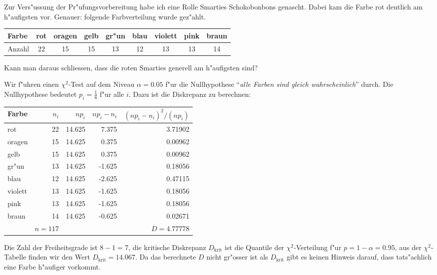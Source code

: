 Zur Vers"ussung der Pr"ufungsvorbereitung habe ich eine Rolle Smarties
Schokobonbons genascht. Dabei kam die Farbe rot deutlich am h"aufigsten vor.
Genauer: folgende Farbverteilung wurde gez"ahlt. 
\begin{center}
\begin{tabular}{|l|cccccccc|}
\hline
Farbe&rot&oragen&gelb&gr"un&blau&violett&pink&braun\\
\hline
Anzahl&22&    15&  15&   13&  12&     13&  13&   14\\
\hline
\end{tabular}
\end{center}
Kann man daraus schliessen, dass die roten Smarties generell am h"aufigsten
sind?

\begin{loesung}
Wir f"uhren einen $\chi^2$-Test auf dem Niveau $\alpha=0.05$
f"ur die Nullhypothese 
``{\it alle Farben sind gleich wahrscheinlich}'' durch.
Die Nullhypothese bedeutet $p_i=\frac18$ f"ur alle $i$.
Dazu ist die Diskrepanz zu berechnen:
\begin{center}
\begin{tabular}{|l|r|r|r|r|}
\hline
Farbe  &$n_i$   &$np_i$&$np_i-n_i$&$(np_i-n_i)^2/(np_i)$\\
\hline
rot    &   22   &14.625&     7.375&              3.71902\\
oragen &   15   &14.625&     0.375&              0.00962\\
gelb   &   15   &14.625&     0.375&              0.00962\\
gr"un  &   13   &14.625&    -1.625&              0.18056\\
blau   &   12   &14.625&    -2.625&              0.47115\\
violett&   13   &14.625&    -1.625&              0.18056\\
pink   &   13   &14.625&    -1.625&              0.18056\\
braun  &   14   &14.625&    -0.625&              0.02671\\
\hline
       &$n=117$ &      &          &$D= 4.77778         $\\
\hline
\end{tabular}
\end{center}
Die Zahl der Freiheitsgrade ist $8-1=7$, die kritische Diskrepanz
$D_{\text{krit}}$ ist die Quantile der $\chi^2$-Verteilung 
f"ur $p=1-\alpha=0.95$, aus der $\chi^2$-Tabelle finden wir den
Wert $D_{\text{krit}}=14.067$. Da das berechnete $D$ nicht gr"osser
ist als $D_{\text{krit}}$ gibt es keinen Hinweis darauf, dass
tats"achlich eine Farbe h"aufiger vorkommt.
\end{loesung}
